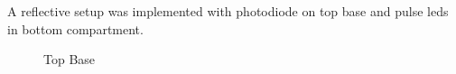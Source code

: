 				
		A reflective setup was implemented with photodiode on top base and pulse leds in bottom compartment. 
				
		\begin{figure}[ht!]
			\centering
			\hfill
			\caption{Top Base}
		\end{figure}
	
